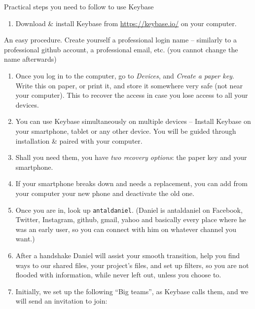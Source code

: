 \documentclass[
  fontsize=13pt,
  english,
  a4paper,
  openany, a4paper, oneside]{article}
\providecommand{\tightlist}{%
  \setlength{\itemsep}{0pt}\setlength{\parskip}{0pt}}
\begin{document}
Practical steps you need to follow to use Keybase

\begin{enumerate}
\def\labelenumi{\arabic{enumi}.}
\tightlist
\item
  Download \& install Keybase from \url{https://keybase.io/} on your computer.
\end{enumerate}

An easy procedure. Create yourself a professional login name -- similarly to a professional github account, a professional email, etc. (you cannot change the name afterwards)

\begin{enumerate}
\def\labelenumi{\arabic{enumi}.}
\setcounter{enumi}{1}
\item
  Once you log in to the computer, go to \emph{Devices}, and \emph{Create a paper key}. Write this on paper, or print it, and store it somewhere very safe (not near your computer). This to recover the access in case you lose access to all your devices.
\item
  You can use Keybase simultaneously on multiple devices -- Install Keybase on your smartphone, tablet or any other device. You will be guided through installation \& paired with your computer.
\item
  Shall you need them, you have \emph{two recovery options}: the paper key and your smartphone.
\item
  If your smartphone breaks down and needs a replacement, you can add from your computer your new phone and deactivate the old one.
\item
  Once you are in, look up \texttt{antaldaniel}. (Daniel is antaldaniel on Facebook, Twitter, Instagram, github, gmail, yahoo and basically every place where he was an early user, so you can connect with him on whatever channel you want.)
\item
  After a handshake Daniel will assist your smooth transition, help you find ways to our shared files, your project's files, and set up filters, so you are not flooded with information, while never left out, unless you choose to.
\item
  Initially, we set up the following ``Big teams'', as Keybase calls them, and we will send an invitation to join:
\end{enumerate}
\end{document}

